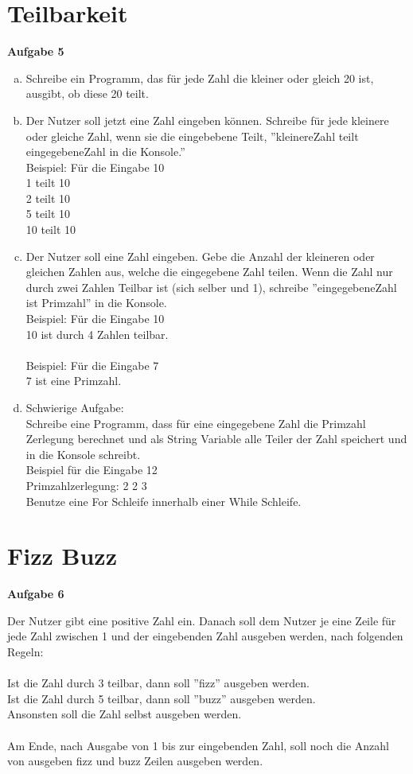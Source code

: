 \documentclass[a4paper,12pt]{article}
\newcommand{\Aufgabe}[1]{
  {
  \vspace*{0.5cm}
  \textsf{\textbf{Aufgabe #1}}
  \vspace*{0.2cm}
  
  }
}
\begin{document}
\section{Teilbarkeit}

\Aufgabe{5} 
\begin{enumerate}[a)]
\item
Schreibe ein Programm, das für jede Zahl die kleiner oder gleich 20 ist, ausgibt, ob diese 20 teilt.
\item
Der Nutzer soll jetzt eine Zahl eingeben können. Schreibe für jede kleinere oder gleiche Zahl, wenn sie die eingebebene Teilt, ''kleinereZahl teilt eingegebeneZahl in die Konsole.'' \\
Beispiel: Für die Eingabe 10  \\
1 teilt 10 \\
2 teilt 10 \\
5 teilt 10 \\
10 teilt 10 \\
\item
Der Nutzer soll eine Zahl eingeben. Gebe die Anzahl der kleineren oder gleichen Zahlen aus, welche die eingegebene Zahl teilen. Wenn die Zahl nur durch zwei Zahlen Teilbar ist (sich selber und 1), schreibe ''eingegebeneZahl ist Primzahl'' in die Konsole. \\
Beispiel: Für die Eingabe 10 \\
10 ist durch 4 Zahlen teilbar. \\
\\
Beispiel: Für die Eingabe 7 \\
7 ist eine Primzahl. \\

\item
Schwierige Aufgabe: \\
Schreibe eine Programm, dass für eine eingegebene Zahl die Primzahl Zerlegung berechnet und als String Variable alle Teiler der Zahl speichert und in die Konsole schreibt. \\
Beispiel für die Eingabe 12 \\
Primzahlzerlegung: 2 2 3
\\
Benutze eine For Schleife innerhalb einer While Schleife.
\end{enumerate}

\section{Fizz Buzz}
\Aufgabe{6} 
Der Nutzer gibt eine positive Zahl ein. Danach soll dem Nutzer je eine Zeile für jede Zahl zwischen 1 und der eingebenden Zahl ausgeben werden, nach folgenden Regeln: \\
\\
    Ist die Zahl durch 3 teilbar, dann soll ''fizz'' ausgeben werden.  \\
    Ist die Zahl durch 5 teilbar, dann soll ''buzz'' ausgeben werden. \\
    Ansonsten soll die Zahl selbst ausgeben werden. \\
\\
Am Ende, nach Ausgabe von 1 bis zur eingebenden Zahl, soll noch die Anzahl von ausgeben fizz und buzz Zeilen ausgeben werden.\\
\\
\end{document}
